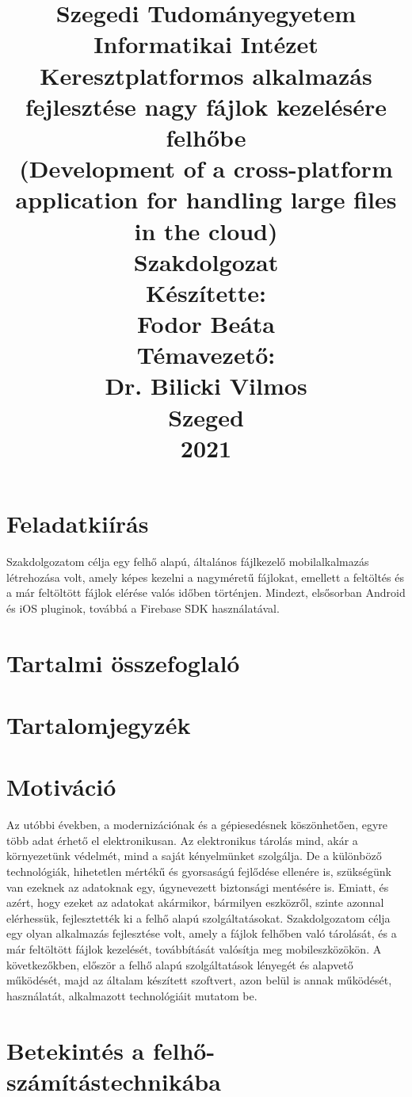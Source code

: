 \documentclass[12pt, twoside]{report}
\title{
	{\large \textbf {Szegedi Tudományegyetem}}\\
	{\large \textbf {Informatikai Intézet}}\\
	\textbf {Keresztplatformos alkalmazás fejlesztése nagy fájlok kezelésére felhőbe}\\
	{\large (Development of a cross-platform application for handling large files in the cloud)}\\
	{Szakdolgozat}\\
	{\small Készítette:}\\
	\textbf {\large Fodor Beáta}\\
	{\small Témavezető:}\\
	\textbf {\large Dr. Bilicki Vilmos}\\
	{Szeged}\\
	{2021}\\
}
\date{}
\begin{document}
\maketitle
\newpage

\chapter*{Feladatkiírás}
Szakdolgozatom célja egy felhő alapú, általános fájlkezelő mobilalkalmazás létrehozása volt, amely képes kezelni a nagyméretű fájlokat, emellett a feltöltés és a már feltöltött fájlok elérése valós időben történjen. Mindezt, elsősorban Android és iOS pluginok, továbbá a Firebase SDK használatával.

\chapter*{Tartalmi összefoglaló}


\chapter*{Tartalomjegyzék}


\chapter*{Motiváció}
Az utóbbi években, a modernizációnak és a gépiesedésnek köszönhetően, egyre több adat érhető el elektronikusan. Az elektronikus tárolás mind, akár a környezetünk védelmét, mind a saját kényelmünket szolgálja. De a különböző technológiák, hihetetlen mértékű és gyorsaságú fejlődése ellenére is, szükségünk van ezeknek az adatoknak egy, úgynevezett biztonsági mentésére is. Emiatt, és azért, hogy ezeket az adatokat akármikor, bármilyen eszközről, szinte azonnal elérhessük, fejlesztették ki a felhő alapú szolgáltatásokat.
Szakdolgozatom célja egy olyan alkalmazás fejlesztése volt, amely a fájlok felhőben való tárolását, és a már feltöltött fájlok kezelését, továbbítását valósítja meg mobileszközökön. A következőkben, először a felhő alapú szolgáltatások lényegét és alapvető működését, majd az általam készített szoftvert, azon belül is annak működését, használatát, alkalmazott technológiáit mutatom be.

\chapter{Betekintés a felhő-számítástechnikába}
\end{document}
